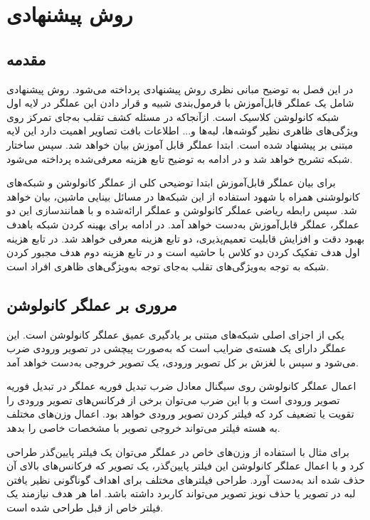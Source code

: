 
\chapter{روش پیشنهادی}
\section{مقدمه} 
در این فصل به توضیح مبانی نظری روش پیشنهادی پرداخته می‌شود. روش پیشنهادی شامل یک عملگر قابل‌آموزش با فرمول‌بندی شبیه  و قرار دادن این عملگر در لایه اول شبکه کانولوشن کلاسیک است. ازآنجا‌که در مسئله کشف تقلب به‌جای تمرکز روی ویژگی‌های ظاهری نظیر گوشه‌ها، لبه‌ها و... اطلاعات بافت تصاویر اهمیت دارد این لایه مبتنی بر  پیشنهاد شده است. 
ابتدا عملگر  قابل آموزش بیان خواهد شد. سپس ساختار شبکه تشریح خواهد شد و در ادامه به توضیح تابع هزینه معرفی‌شده پرداخته می‌شود. 

برای بیان عملگر  قابل‌آموزش ابتدا توضیحی کلی از عملگر کانولوشن و شبکه‌های کانولوشنی همراه با شهود استفاده از این شبکه‌ها در مسائل بینایی ماشین، بیان خواهد شد. سپس رابطه ریاضی عملگر کانولوشن و عملگر  ارائه‌شده و با همانندسازی این دو عملگر، عملگر  قابل‌آموزش به‌دست خواهد آمد.
در ادامه برای بهینه کردن شبکه با‌هدف بهبود دقت و افزایش قابلیت تعمیم‌پذیری، دو تابع هزینه معرفی خواهد شد. در تابع هزینه اول هدف تفکیک کردن دو کلاس با حاشیه است و در تابع هزینه دوم هدف مجبور کردن شبکه به توجه به‌ویژگی‌های تقلب به‌جای توجه به‌ویژگی‌های ظاهری افراد است.
\section{مروری بر عملگر کانولوشن}
یکی از اجزای اصلی شبکه‌های مبتنی بر یادگیری عمیق عملگر کانولوشن است. این عملگر دارای یک هسته‌ی ضرایب است که به‌صورت پیچشی در تصویر ورودی ضرب می‌شود و سپس با لغزش بر کل تصویر ورودی، یک تصویر خروجی به‌دست خواهد آمد. 

اعمال عملگر کانولوشن روی سیگنال معادل ضرب تبدیل فوریه عملگر در تبدیل فوریه تصویر ورودی است و با این ضرب می‌توان برخی از فرکانس‌های تصویر ورودی را تقویت یا تضعیف کرد که فیلتر کردن تصویر ورودی خواهد بود. اعمال وزن‌های مختلف به هسته فیلتر می‌تواند خروجی تصویر با مشخصات خاصی را بدهد.

برای مثال با استفاده از وزن‌های خاص در عملگر می‌توان یک فیلتر پایین‌گذر طراحی کرد و با اعمال عملگر کانولوشن این فیلتر پایین‌گذر، یک تصویر که فرکانس‌های بالای آن حذف شده اند به‌دست آورد. طراحی فیلترهای مختلف برای اهداف گوناگونی نظیر یافتن لبه در تصویر یا حذف نویز تصویر می‌تواند کاربرد داشته باشد. اما هر هدف نیازمند یک فیلتر خاص از قبل طراحی شده است. 

